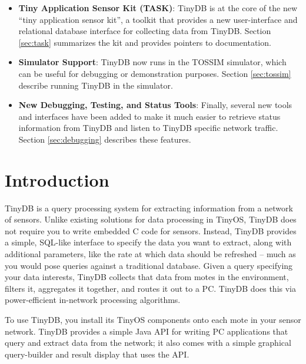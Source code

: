 \documentclass[11pt]{article}
\begin{document}
\begin{itemize}
\item {\bf Tiny Application Sensor Kit (TASK)}: TinyDB is at the core of the
  new ``tiny application sensor kit'', a toolkit that provides a new
  user-interface and relational database interface for collecting data
  from TinyDB.  Section \ref{sec:task} summarizes the kit and provides
  pointers to documentation.

\item {\bf Simulator Support}: TinyDB now runs in the TOSSIM simulator, which can
  be useful for debugging or demonstration purposes.  Section \ref{sec:tossim}
  describe running TinyDB in the simulator.
  
\item {\bf New Debugging, Testing, and Status Tools}: Finally, several
  new tools and interfaces have been added to make it much easier to
  retrieve status information from TinyDB and listen to TinyDB
  specific network traffic. Section \ref{sec:debugging} describes these features.

\end{itemize}

\section{Introduction}

TinyDB is a query processing system for extracting
information from a network of
sensors. Unlike existing solutions for
data processing in TinyOS, TinyDB does not
require you to write embedded C code for
sensors.  Instead, TinyDB
provides a simple, SQL-like interface to specify the data
you want to extract, along with additional parameters, like the rate
at which data should be refreshed -- much as you would pose queries
against a traditional database.  Given a query specifying your data
interests, TinyDB collects that data from
motes in the environment, filters it,
aggregates it together, and routes it
out to a PC.  TinyDB does this via power-efficient
in-network processing algorithms.

To use TinyDB, you install its TinyOS components onto
each mote in your sensor network. 
TinyDB provides a simple Java API
for writing PC applications that query and extract data from the
network; it also comes with a simple graphical query-builder and
result display that uses the API.
\end{document}
